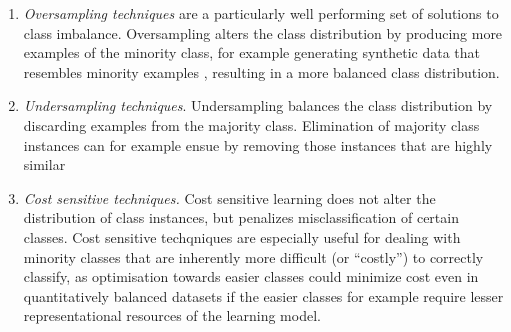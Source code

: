 \documentclass[twocolumn]{article}
\providecommand{\tightlist}{%
  \setlength{\itemsep}{0pt}\setlength{\parskip}{0pt}}
\begin{document}
{\begin{enumerate}
\def\labelenumi{\arabic{enumi}.}
\tightlist
\item
  \emph{Oversampling techniques} are a particularly well performing set
  of solutions to class imbalance. Oversampling alters the class
  distribution by producing more examples of the minority class, for
  example generating synthetic data that resembles minority examples
  \citep[e.g.][]{he2008adasyn, chawla2002smote}, resulting in a more
  balanced class distribution.
\item
  \emph{Undersampling techniques}. Undersampling balances the class
  distribution by discarding examples from the majority class.
  Elimination of majority class instances can for example ensue by
  removing those instances that are highly similar
  \citep[e.g.][]{tomek1976two}
\item
  \emph{Cost sensitive techniques.} Cost sensitive learning does not
  alter the distribution of class instances, but penalizes
  misclassification of certain classes. Cost sensitive techqniques are
  especially useful for dealing with minority classes that are
  inherently more difficult (or ``costly'') to correctly classify, as
  optimisation towards easier classes could minimize cost even in
  quantitatively balanced datasets if the easier classes for example
  require lesser representational resources of the learning model.
\end{enumerate}

}
\end{document}
